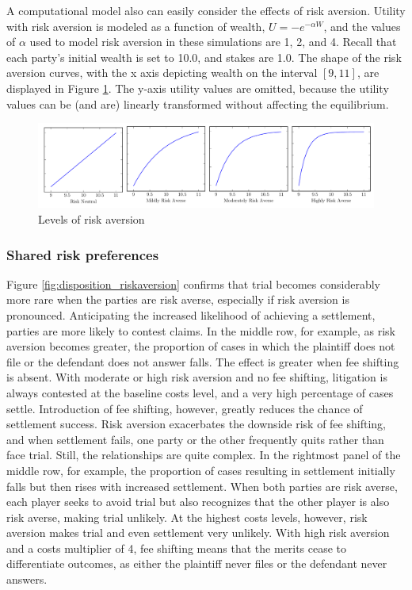 \documentclass{article}
\begin{document}
A computational model also can easily consider the effects of risk aversion. Utility with risk aversion is modeled as a function of wealth, $U=-e^{-\alpha W}$, and the values of $\alpha$ used to model risk aversion in these simulations are 1, 2, and 4. Recall that each party's initial wealth is set to 10.0, and stakes are 1.0. The shape of the risk aversion curves, with the x axis depicting wealth on the interval $[9, 11]$,  are displayed in Figure \ref{fig:riskaversion}. The y-axis utility values are omitted, because the utility values can be (and are) linearly transformed without affecting the equilibrium. 

\begin{figure}[h!]
\centering
\includegraphics[scale=0.40, trim={0in 0in 0in 0in}, clip]{../Figures/risk aversion.pdf}
\caption{Levels of risk aversion}
\label{fig:riskaversion}
\end{figure}

\subsubsection{Shared risk preferences}

Figure \ref{fig:disposition_riskaversion} confirms that trial becomes considerably more rare when the parties are risk averse, especially if risk aversion is pronounced. Anticipating the increased likelihood of achieving a settlement, parties are more likely to contest claims. In the middle row, for example, as risk aversion becomes greater, the proportion of cases in which the plaintiff does not file or the defendant does not answer falls. The effect is greater when fee shifting is absent. With moderate or high risk aversion and no fee shifting, litigation is always contested at the baseline costs level, and a very high percentage of cases settle. Introduction of fee shifting, however, greatly reduces the chance of settlement success. Risk aversion exacerbates the downside risk of fee shifting, and when settlement fails, one party or the other frequently quits rather than face trial. Still, the relationships are quite complex. In the rightmost panel of the middle row, for example, the proportion of cases resulting in settlement initially falls but then rises with increased settlement. When both parties are risk averse, each player seeks to avoid trial but also recognizes that the other player is also risk averse, making trial unlikely. At the highest costs levels, however, risk aversion makes trial and even settlement very unlikely. With high risk aversion and a costs multiplier of 4, fee shifting means that the merits cease to differentiate outcomes, as either the plaintiff never files or the defendant never answers.
\end{document}
